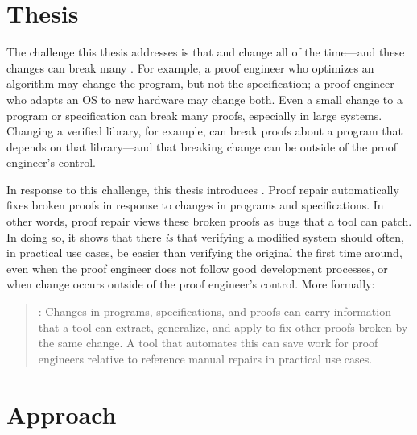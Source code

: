 \section{Thesis}
\label{sec:thesis}

The challenge this thesis addresses is that  and 
change all of the time---and these changes can break many .
For example, a proof engineer who optimizes an algorithm may change the program, but not the specification;
a proof engineer who adapts an OS to new hardware may change both.
Even a small change to a program or specification can break many proofs, especially in large systems.
Changing a verified library, for example, can break proofs about a program that depends on that library---and that breaking change
can be outside of the proof engineer's control.

In response to this challenge, this thesis introduces .
Proof repair automatically fixes broken proofs in response to changes in programs and specifications.
In other words, proof repair views these broken proofs as bugs that a tool can patch.
In doing so, it shows that there \textit{is}  that verifying a modified system should often, in practical use cases, be easier than verifying the original the first time around,
even when the proof engineer does not follow good development processes,
or when change occurs outside of the proof engineer's control.
More formally:

\begin{quote}
\textbf{}: Changes in programs, specifications, and proofs can carry information that a tool can extract, generalize, and apply to fix other proofs broken by the same change. A tool that automates this can save work for proof engineers relative to reference manual repairs in practical use cases.
\end{quote}

\section{Approach}
\label{sec:intro-approach}

